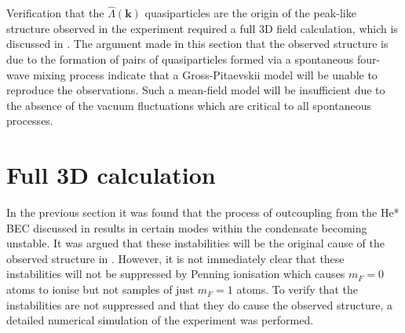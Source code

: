 Verification that the $\hat{\Lambda}(\bm{k})$ quasiparticles are the origin of the peak-like structure observed in the experiment required a full 3D field calculation, which is discussed in .  The argument made in this section that the observed structure is due to the formation of pairs of quasiparticles formed via a spontaneous four-wave mixing process indicate that a Gross-Pitaevskii model will be unable to reproduce the observations. Such a mean-field model will be insufficient due to the absence of the vacuum fluctuations which are critical to all spontaneous processes.

\section{Full 3D calculation}
\label{Peaks:3DCalculation}
In the previous section it was found that the process of outcoupling from the He* BEC discussed in  results in certain modes within the condensate becoming unstable. It was argued that these instabilities will be the original cause of the observed structure in . However, it is not immediately clear that these instabilities will not be suppressed by Penning ionisation which causes $m_F=0$ atoms to ionise but not samples of just $m_F=1$ atoms. To verify that the instabilities are not suppressed and that they do cause the observed structure, a detailed numerical simulation of the experiment was performed.

